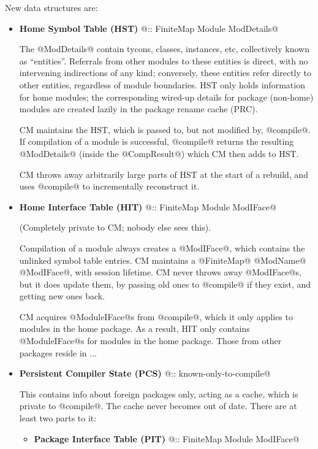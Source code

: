 \documentclass[11pt]{article}
\begin{document}
New data structures are:
\begin{itemize}

\item
   {\bf Home Symbol Table (HST)} @:: FiniteMap Module ModDetails@

   The @ModDetails@ contain tycons, classes, instances,
   etc, collectively known as ``entities''.  Referrals from other
   modules to these entities is direct, with no intervening
   indirections of any kind; conversely, these entities refer directly
   to other entities, regardless of module boundaries.  HST only
   holds information for home modules; the corresponding wired-up
   details for package (non-home) modules are created lazily in
   the package rename cache (PRC).

   CM maintains the HST, which is passed to, but not modified by,
   @compile@.  If compilation of a module is successful, @compile@
   returns the resulting @ModDetails@ (inside the @CompResult@) which
   CM then adds to HST.

   CM throws away arbitrarily large parts of HST at the start of a
   rebuild, and uses @compile@ to incrementally reconstruct it.

\item
   {\bf Home Interface Table (HIT)} @:: FiniteMap Module ModIFace@

   (Completely private to CM; nobody else sees this).

   Compilation of a module always creates a @ModIFace@, which contains
   the unlinked symbol table entries.  CM maintains a @FiniteMap@
   @ModName@ @ModIFace@, with session lifetime.  CM never throws away
   @ModIFace@s, but it does update them, by passing old ones to
   @compile@ if they exist, and getting new ones back.

   CM acquires @ModuleIFace@s from @compile@, which it only applies
   to modules in the home package.  As a result, HIT only contains
   @ModuleIFace@s for modules in the home package.  Those from other
   packages reside in ...

\item
   {\bf Persistent Compiler State (PCS)} @:: known-only-to-compile@

   This contains info about foreign packages only, acting as a cache,
   which is private to @compile@.  The cache never becomes out of
   date.  There are at least two parts to it:

   \begin{itemize}
   \item
      {\bf Package Interface Table (PIT)} @:: FiniteMap Module ModIFace@


\end{itemize}
\end{itemize}
\end{document}
